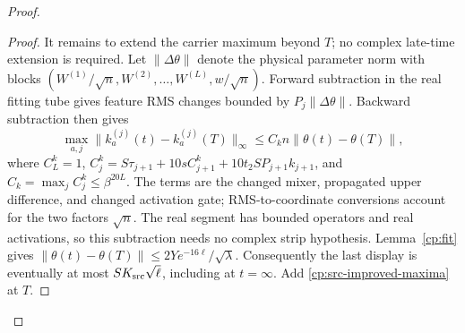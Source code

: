 \begin{proof}
\begin{proof}
It remains to extend the carrier maximum beyond \(T\); no complex
late-time extension is required.  Let \(\|\Delta\theta\|\) denote
the physical parameter norm with blocks
\((W^{(1)}/\sqrt n,W^{(2)},\ldots,W^{(L)},w/\sqrt n)\).
Forward subtraction in the real fitting tube gives feature RMS
changes bounded by \(P_j\|\Delta\theta\|\).  Backward subtraction
then gives
\[
 \max_{a,j}\|k_a^{(j)}(t)-k_a^{(j)}(T)\|_\infty
 \le C_k n\|\theta(t)-\theta(T)\|,
\]
where \(C_L^k=1\),
\(C_j^k=S\tau_{j+1}+10sC_{j+1}^k+
10t_2SP_{j+1}k_{j+1}\), and \(C_k=\max_jC_j^k\le\beta^{20L}\).
The terms are the changed mixer, propagated upper difference, and
changed activation gate; RMS-to-coordinate conversions account for
the two factors \(\sqrt n\).  The real segment has bounded
operators and real activations, so this subtraction needs no complex
strip hypothesis.  Lemma~\ref{cp:fit} gives
\(\|\theta(t)-\theta(T)\|\le2Y e^{-16\ell}/\sqrt\lambda\).
Consequently the last display is eventually at most
\(SK_{\rm src}\sqrt\ell\), including at \(t=\infty\).
Add \eqref{cp:src-improved-maxima} at \(T\).
\end{proof}


\end{proof}
